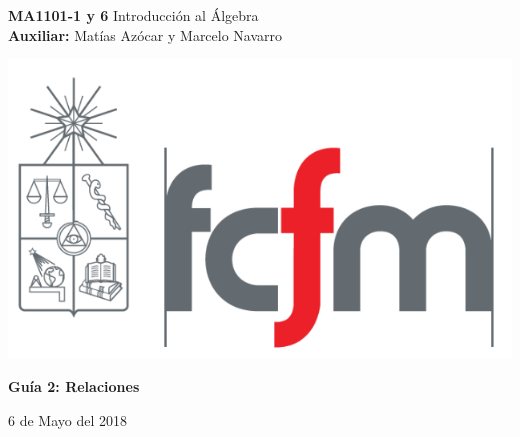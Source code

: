 \documentclass[10pt]{article}
\theoremstyle{plain}
\theoremstyle{definition}
\begin{document}

   \begin{minipage}[t]{7 cm}
   \vspace{-6.0ex}
\textbf{MA1101-1 y 6} Introducción al Álgebra\\
\textbf{Auxiliar:} Matías Azócar y Marcelo Navarro
   \end{minipage}%
   \hfill
   \begin{minipage}[t]{3.2 cm}
     \vspace{-8.5ex}
     \raggedright\includegraphics[scale=0.15]{img/fcfm2.png} 
   \end{minipage}
\begin{center}
\LARGE\textbf{Guía 2: Relaciones} \\
\vspace{3 mm}

\normalsize 6 de Mayo del 2018
\end{center}
\end{document}
